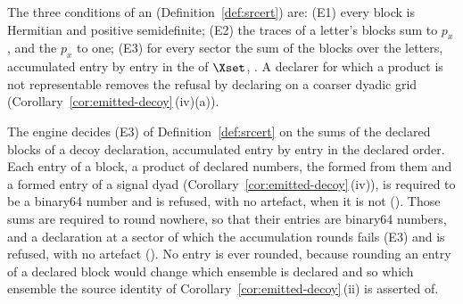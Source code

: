 
The three conditions of an 
(Definition~\ref{def:srcert}) are: (E1) every block is Hermitian and positive
semidefinite; (E2) the traces of a letter's blocks sum to $p_x$, and the $p_x$
to one; (E3) for every sector the sum of the blocks over the letters,
accumulated entry by entry in the  of $\Xset$,
. A declarer for which a product is
not representable removes the refusal by declaring on a coarser dyadic grid
(Corollary~\ref{cor:emitted-decoy}\,(iv)(a)).

\begin{requirement}\label{req:exact-decoy-blocks}
The engine decides (E3) of Definition~\ref{def:srcert} on the sums of the
declared blocks of a decoy declaration, accumulated entry by entry in the
declared order. Each entry of a block, a product of declared numbers, the
 formed from them and a formed entry of a signal dyad
(Corollary~\ref{cor:emitted-decoy}\,(iv)), is
required to be a binary64 number and is refused, with no artefact, when it is
not (). Those sums are required to round
nowhere, so that their entries are binary64 numbers, and a declaration at a
sector of which the accumulation rounds fails (E3) and is refused, with no
artefact (). No entry is ever
rounded, because rounding an entry of a declared block would change which
ensemble is declared and so which ensemble the source identity of
Corollary~\ref{cor:emitted-decoy}\,(ii) is asserted of.
\end{requirement}
